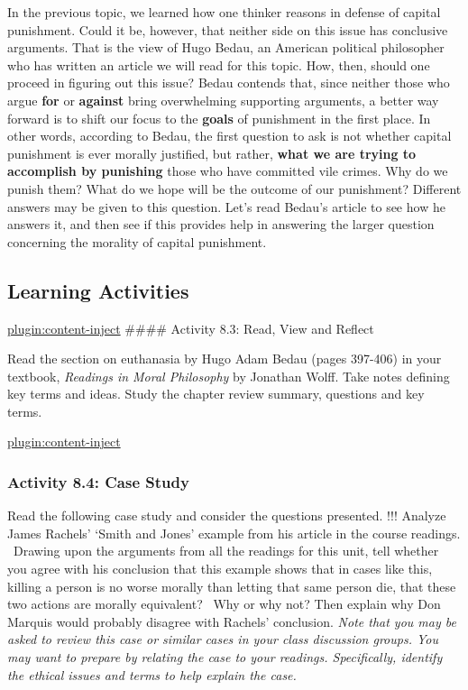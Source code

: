 \documentclass[
]{book}
\begin{document}
In the previous topic, we learned how one thinker reasons in defense of capital punishment. Could it be, however, that neither side on this issue has conclusive arguments. That is the view of Hugo Bedau, an American political philosopher who has written an article we will read for this topic.
How, then, should one proceed in figuring out this issue? Bedau contends that, since neither those who argue \textbf{for} or \textbf{against} bring overwhelming supporting arguments, a better way forward is to shift our focus to the \textbf{goals} of punishment in the first place.
In other words, according to Bedau, the first question to ask is not whether capital punishment is ever morally justified, but rather, \textbf{what we are trying to accomplish by punishing} those who have committed vile crimes. Why do we punish them? What do we hope will be the outcome of our punishment? Different answers may be given to this question. Let's read Bedau's article to see how he answers it, and then see if this provides help in answering the larger question concerning the morality of capital punishment.

\hypertarget{learning-activities-20}{%
\subsection{Learning Activities}\label{learning-activities-20}}

\href{../_8-3}{plugin:content-inject}
\#\#\#\# Activity 8.3: Read, View and Reflect

Read the section on euthanasia by Hugo Adam Bedau (pages 397-406) in your
textbook, \emph{Readings in Moral Philosophy} by Jonathan Wolff. Take notes defining
key terms and ideas. Study the chapter review summary, questions and key terms.

\href{../_8-4}{plugin:content-inject}

\hypertarget{activity-8.4-case-study}{%
\subsubsection{Activity 8.4: Case Study}\label{activity-8.4-case-study}}

Read the following case study and consider the questions presented.
!!! Analyze James Rachels' `Smith and Jones' example from his article in the course readings. ~Drawing upon the arguments from all the readings for this unit, tell whether you agree with his conclusion that this example shows that in cases like this, killing a person is no worse morally than letting that same person die, that these two actions are morally equivalent? ~Why or why not? Then explain why Don Marquis would probably disagree with Rachels' conclusion.
\emph{Note that you may be asked to review this case or similar cases in your class discussion groups. You may want to prepare by relating the case to your readings. Specifically, identify the ethical issues and terms to help explain the case.}
\end{document}
